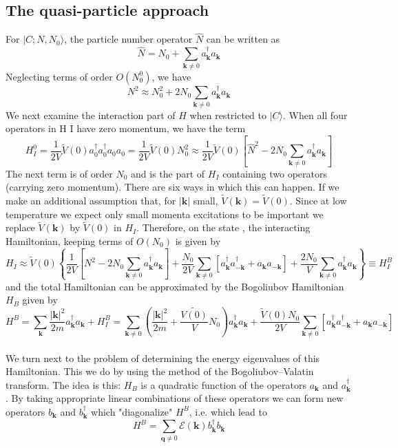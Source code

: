 \documentclass[cyan]{elegantnote}
\begin{document}
\subsection{The quasi-particle approach}
For $|C;N,N_0\rangle$, the particle number operator $\hat{N}$ can be written as
\[\hat{N} = N_0 + \sum_{\bm{k}\neq 0}a_{\bm{k}}^{\dagger} a_{\bm{k}} \]
Neglecting terms of order $O(N_0^0)$, we have
\[N^2 \approx N_0^2 + 2N_0\sum_{\bm{k}\neq 0}a_{\bm{k}}^{\dagger} a_{\bm{k}} \]
We next examine the interaction part of $H$ when restricted to $|C\rangle$. When all four operators in H I have zero momentum, we have the term
\[H_I^0 = \frac{1}{2V} \tilde{V}(0) a^{\dagger}_{0} a^{\dagger}_{0} a_{0} a_{0} = \frac{1}{2V}\tilde{V}(0)N_0^2 \approx  \frac{1}{2V}\tilde{V}(0) \left[\hat{N}^2-2N_0\sum_{\bm{k}\neq 0}a_{\bm{k}}^{\dagger} a_{\bm{k}} \right]\]
The next term is of order $N_0$ and is the part of $H_I$ containing two operators (carrying zero momentum). There are six ways in which this can happen. If we make an additional assumption that, for $|\bm{k}|$ small, $\tilde{V}(\bm{k}) = \tilde{V}(0)$. 
Since at low temperature we expect only small momenta excitations to be important we replace $\tilde{V}(\bm{k})$ by $\tilde{V}(0)$ in $H_I$. Therefore, on the state , the interacting Hamiltonian, keeping terms of $O(N_0)$ is given by
\[H_I \approx \tilde{V}(0) \left\{ \frac{1}{2V}\left[N^2-2N_0\sum_{\bm{k}\neq 0}a_{\bm{k}}^{\dagger} a_{\bm{k}} \right]  +\frac{N_0}{2V}\sum_{\bm{k}\neq 0} [a^{\dagger}_{\bm{k}} a^{\dagger}_{-\bm{k}} + a_{\bm{k}} a_{-\bm{k}}] +\frac{2N_0}{V} \sum_{\bm{k}\neq 0}a_{\bm{k}}^{\dagger} a_{\bm{k}} \right\} \equiv H_I^B \] 
and the total Hamiltonian can be approximated by the Bogoliubov Hamiltonian $H_B$ given by
\[H^B = \sum_{\bm{k}} \frac{|\bm{k}|^2}{2m} a_{\bm{k}}^{\dagger} a_{\bm{k}} + H_I^B = \sum_{\bm{k}\neq 0} \left(\frac{|\bm{k}|^2}{2m} + \frac{\tilde{V(0)}}{V}N_0 \right)a_{\bm{k}}^{\dagger} a_{\bm{k}}  + \frac{\tilde{V}(0)N_0}{2V} \sum_{\bm{k}\neq 0} [a^{\dagger}_{\bm{k}} a^{\dagger}_{-\bm{k}} + a_{\bm{k}} a_{-\bm{k}}]\]
\\
We turn next to the problem of determining the energy eigenvalues of this Hamiltonian. This we do by using the method of the Bogoliubov–Valatin transform. 
The idea is this: $H_B$ is a quadratic function of the operators $a_{\bm{k}}$ and $a^{\dagger}_{\bm{k}}$. 
By taking appropriate linear combinations of these operators we can form new operators $b_{\bm{k}}$ and $b^{\dagger}_{\bm{k}}$ which "diagonalize" $H^B$, i.e. which lead to
\[H^B = \sum_{\bm{q} \neq 0} \mathcal{E}(\bm{k})b^{\dagger}_{\bm{k}} b_{\bm{k}} \]
\end{document}
